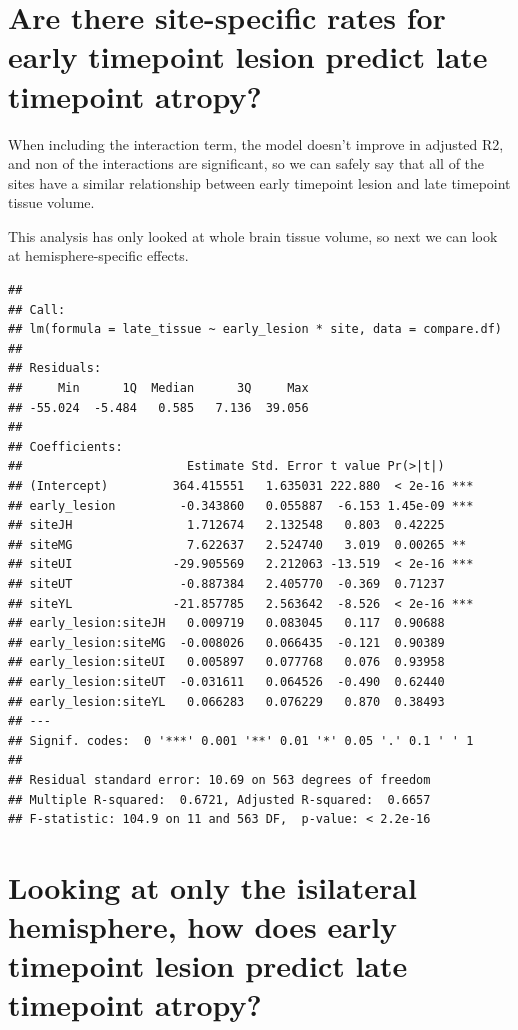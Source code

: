 \documentclass[
]{article}
\begin{document}
\hypertarget{are-there-site-specific-rates-for-early-timepoint-lesion-predict-late-timepoint-atropy}{%
\section{Are there site-specific rates for early timepoint lesion
predict late timepoint
atropy?}\label{are-there-site-specific-rates-for-early-timepoint-lesion-predict-late-timepoint-atropy}}

When including the interaction term, the model doesn't improve in
adjusted R2, and non of the interactions are significant, so we can
safely say that all of the sites have a similar relationship between
early timepoint lesion and late timepoint tissue volume.

This analysis has only looked at whole brain tissue volume, so next we
can look at hemisphere-specific effects.

\begin{verbatim}
## 
## Call:
## lm(formula = late_tissue ~ early_lesion * site, data = compare.df)
## 
## Residuals:
##     Min      1Q  Median      3Q     Max 
## -55.024  -5.484   0.585   7.136  39.056 
## 
## Coefficients:
##                       Estimate Std. Error t value Pr(>|t|)    
## (Intercept)         364.415551   1.635031 222.880  < 2e-16 ***
## early_lesion         -0.343860   0.055887  -6.153 1.45e-09 ***
## siteJH                1.712674   2.132548   0.803  0.42225    
## siteMG                7.622637   2.524740   3.019  0.00265 ** 
## siteUI              -29.905569   2.212063 -13.519  < 2e-16 ***
## siteUT               -0.887384   2.405770  -0.369  0.71237    
## siteYL              -21.857785   2.563642  -8.526  < 2e-16 ***
## early_lesion:siteJH   0.009719   0.083045   0.117  0.90688    
## early_lesion:siteMG  -0.008026   0.066435  -0.121  0.90389    
## early_lesion:siteUI   0.005897   0.077768   0.076  0.93958    
## early_lesion:siteUT  -0.031611   0.064526  -0.490  0.62440    
## early_lesion:siteYL   0.066283   0.076229   0.870  0.38493    
## ---
## Signif. codes:  0 '***' 0.001 '**' 0.01 '*' 0.05 '.' 0.1 ' ' 1
## 
## Residual standard error: 10.69 on 563 degrees of freedom
## Multiple R-squared:  0.6721, Adjusted R-squared:  0.6657 
## F-statistic: 104.9 on 11 and 563 DF,  p-value: < 2.2e-16
\end{verbatim}

\newpage

\hypertarget{looking-at-only-the-isilateral-hemisphere-how-does-early-timepoint-lesion-predict-late-timepoint-atropy}{%
\section{Looking at only the isilateral hemisphere, how does early
timepoint lesion predict late timepoint
atropy?}\label{looking-at-only-the-isilateral-hemisphere-how-does-early-timepoint-lesion-predict-late-timepoint-atropy}}
\end{document}
